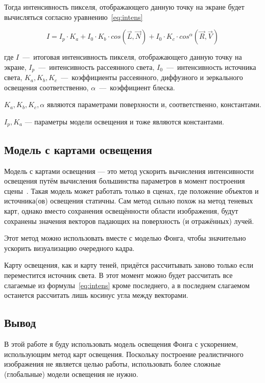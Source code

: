 Тогда интенсивность пикселя, отображающего данную точку на экране будет вычисляться согласно уравнению~\ref{eq:intens}

\begin{equation}
    I = I_p \cdot K_a + I_0 \cdot K_b \cdot cos(\vec{L}, \vec{N}) + I_0 \cdot K_c \cdot cos^\alpha(\vec{R}, \vec{V})  
    \label{eq:intens}
\end{equation}

где $I$~---~итоговая интенсивность пикселя, отображающего данную точку на экране, $I_p$~---~интенсивность рассеянного света, $I_0$~---~интенсивность источника света, $K_a, K_b, K_c$~---~коэффициенты рассеянного, диффузного и зеркального освещения соответственно, $\alpha$~---~коэффициент блеска. 

$K_a, K_b, K_c, \alpha$ являются параметрами поверхности и, соответственно, константами. 

$I_p, K_a$ --- параметры модели освещения и тоже являются константами.

\subsection{Модель с картами освещения}

Модель с картами освещения --- это метод ускорить вычисления интенсивности освещения путём вычисления большинства параметров в момент построения сцены~\cite{LightMaps}. Такая модель может работать только в сценах, где положение объектов и источника(ов) освещения статичны. Сам метод сильно похож на метод теневых карт, однако вместо сохранения освещённости области изображения, будут сохранены значения векторов падающих на поверхность (и отражённых) лучей. 

Этот метод можно использовать вместе с моделью Фонга, чтобы значительно ускорить визуализацию очередного кадра.

Карту освещения, как и карту теней, придётся рассчитывать заново только если переместится источник света. В этот момент можно будет рассчитать все слагаемые из формулы~\ref{eq:intens} кроме последнего, а в последнем слагаемом останется рассчитать лишь косинус угла между векторами.

\subsection{Вывод}

В этой работе я буду использовать модель освещения Фонга с ускорением, использующим метод карт освещения. Поскольку построение реалистичного изображения не является целью работы, использовать более сложные (глобальные) модели освещения не нужно.